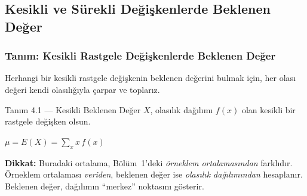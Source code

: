 \documentclass[light]{lutbeamer}
\begin{document}
\subsection{Kesikli ve Sürekli Değişkenlerde Beklenen Değer}

\begin{frame}[fragile]
  \frametitle{Tanım: Kesikli Rastgele Değişkenlerde Beklenen Değer}
  Herhangi bir kesikli rastgele değişkenin beklenen değerini bulmak için, her olası değeri kendi olasılığıyla çarpar ve toplarız.
  \begin{center}
    \begin{minipage}{0.9\textwidth}
      \begin{block}{Tanım 4.1 --- Kesikli Beklenen Değer}
        $X$, olasılık dağılımı $f(x)$ olan kesikli bir rastgele değişken olsun.
        \begin{center}
          $\mu = E(X) = \displaystyle\sum_{x} x\, f(x)$
        \end{center}
      \end{block}
    \end{minipage}
  \end{center}

  \medskip
  {\small \textbf{Dikkat:} Buradaki ortalama, Bölüm~1'deki \emph{örneklem ortalamasından} farklıdır. Örneklem ortalaması \textit{veriden}, beklenen değer ise \textit{olasılık dağılımından} hesaplanır. Beklenen değer, dağılımın ``merkez'' noktasını gösterir.}
\end{frame}
\end{document}
